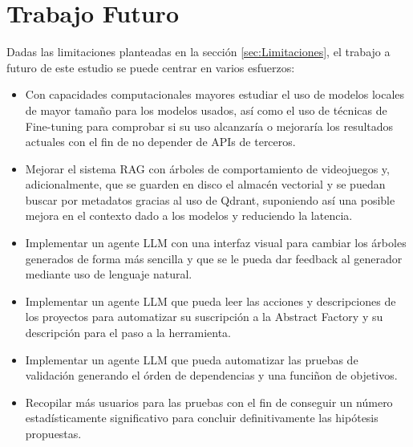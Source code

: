 \section{Trabajo Futuro}
Dadas las limitaciones planteadas en la sección \ref{sec:Limitaciones}, el trabajo a futuro de este estudio se puede centrar en varios esfuerzos:
\begin{itemize}
    \item Con capacidades computacionales mayores estudiar el uso de modelos locales de mayor tamaño para los modelos usados, así como el uso de técnicas de Fine-tuning para comprobar si su uso alcanzaría o mejoraría los resultados actuales con el fin de no depender de APIs de terceros.
    \item Mejorar el sistema RAG con árboles de comportamiento de videojuegos y, adicionalmente, que se guarden en disco el almacén vectorial y se puedan buscar por metadatos gracias al uso de Qdrant, suponiendo así una posible mejora en el contexto dado a los modelos y reduciendo la latencia.
    \item Implementar un agente LLM con una interfaz visual para cambiar los árboles generados de forma más sencilla y que se le pueda dar feedback al generador mediante uso de lenguaje natural.
    \item Implementar un agente LLM que pueda leer las acciones y descripciones de los proyectos para automatizar su suscripción a la Abstract Factory y su descripción para el paso a la herramienta.
    \item Implementar un agente LLM que pueda automatizar las pruebas de validación generando el órden de dependencias y una funciñon de objetivos.
    \item Recopilar más usuarios para las pruebas con el fin de conseguir un número estadísticamente significativo para concluir definitivamente las hipótesis propuestas.
\end{itemize}